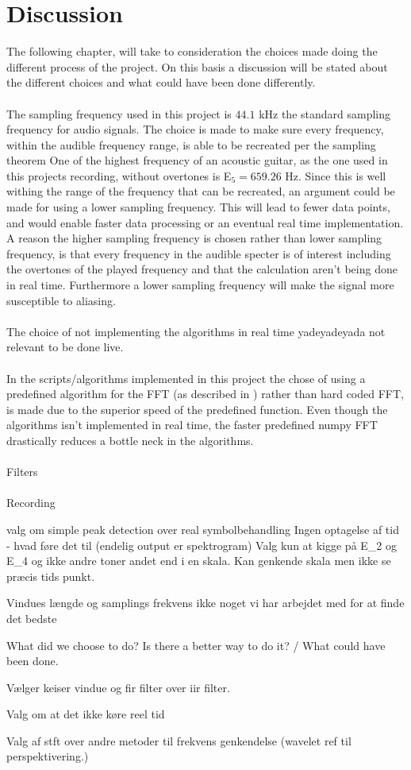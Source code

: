 \chapter{Discussion}
The following chapter, will take to consideration the choices made doing the different process of the project.
On this basis a discussion will be stated about the different choices and what could have been done differently.
\\\\
The sampling frequency used in this project is $44.1$ kHz the standard sampling frequency for audio signals.
The choice is made to make sure every frequency, within the audible frequency range, is able to be recreated per the sampling theorem 
One of the highest frequency of an acoustic guitar, as the one used in this projects recording, without overtones is E$_5 = 659.26$ Hz.
Since this is well withing the range of the frequency that can be recreated, an argument could be made for using a lower sampling frequency.
This will lead to fewer data points, and would enable faster data processing or an eventual real time implementation. 
A reason the higher sampling frequency is chosen rather than lower sampling frequency, is that every frequency in the audible specter is of interest including the overtones of the played frequency and that the calculation aren't being done in real time.
Furthermore a lower sampling frequency will make the signal more susceptible to aliasing. 
\\\\

The choice of not implementing the algorithms in real time yadeyadeyada not relevant to be done live. 
\\\\
In the scripts/algorithms implemented in this project the chose of using  a predefined algorithm for the FFT (as described in ) rather than hard coded FFT, is made due to the superior speed of the predefined function. 
Even though the algorithms isn't implemented in real time, the faster predefined numpy FFT drastically reduces a bottle neck in the algorithms.
\\\\
Filters
\\\\
Recording
 
valg om simple peak detection over real symbolbehandling
Ingen optagelse af tid - hvad føre det til
(endelig output er spektrogram)
Valg kun at kigge på E_2 og E_4 og ikke andre toner andet end i en skala.
Kan genkende skala men ikke se præcis tids punkt.

Vindues længde og samplings frekvens ikke noget vi har arbejdet med for at finde det bedste


What did we choose to do? Is there a better way to do it? / What could have been done.


Vælger keiser vindue og fir filter
over iir filter.

Valg om at det ikke køre reel tid


Valg af stft over andre metoder til frekvens genkendelse (wavelet ref til perspektivering.)


